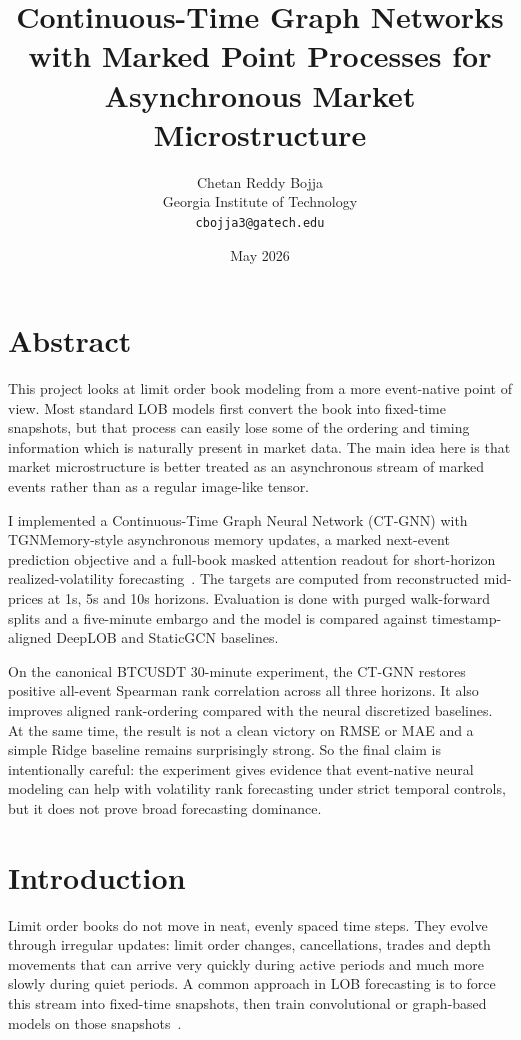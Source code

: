 \documentclass[11pt]{article}
\title{Continuous-Time Graph Networks with Marked Point Processes for Asynchronous Market Microstructure}
\author{
Chetan Reddy Bojja\\
Georgia Institute of Technology\\
\texttt{cbojja3@gatech.edu}
}
\date{May 2026}
\begin{document}
\maketitle

\section*{Abstract}

This project looks at limit order book modeling from a more event-native point of view. Most standard LOB models first convert the book into fixed-time snapshots, but that process can easily lose some of the ordering and timing information which is naturally present in market data. The main idea here is that market microstructure is better treated as an asynchronous stream of marked events rather than as a regular image-like tensor.

I implemented a Continuous-Time Graph Neural Network (CT-GNN) with TGNMemory-style asynchronous memory updates, a marked next-event prediction objective and a full-book masked attention readout for short-horizon realized-volatility forecasting~\cite{rossi2020tgn,mei2017neuralhawkes}. The targets are computed from reconstructed mid-prices at 1s, 5s and 10s horizons. Evaluation is done with purged walk-forward splits and a five-minute embargo and the model is compared against timestamp-aligned DeepLOB and StaticGCN baselines.

On the canonical BTCUSDT 30-minute experiment, the CT-GNN restores positive all-event Spearman rank correlation across all three horizons. It also improves aligned rank-ordering compared with the neural discretized baselines. At the same time, the result is not a clean victory on RMSE or MAE and a simple Ridge baseline remains surprisingly strong. So the final claim is intentionally careful: the experiment gives evidence that event-native neural modeling can help with volatility rank forecasting under strict temporal controls, but it does not prove broad forecasting dominance.

\section{Introduction}

Limit order books do not move in neat, evenly spaced time steps. They evolve through irregular updates: limit order changes, cancellations, trades and depth movements that can arrive very quickly during active periods and much more slowly during quiet periods. A common approach in LOB forecasting is to force this stream into fixed-time snapshots, then train convolutional or graph-based models on those snapshots~\cite{zhang2019deeplob,ntakaris2018benchmark}.
\end{document}
